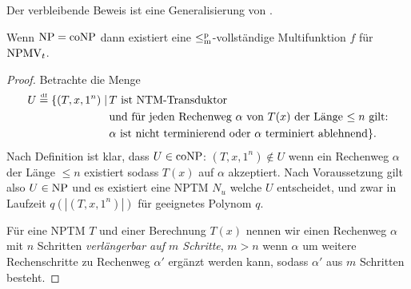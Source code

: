 Der verbleibende Beweis ist eine Generalisierung von \textcite{dingel_separation_2022}.
\begin{theorem}\label{thm:npmvt-vs-npconp}
    Wenn $\mathrm{NP}=\mathrm{coNP}$ dann existiert eine $\leq_\mathrm{m}^\mathrm{p}$-vollständige Multifunktion $f$ für $\mathrm{NPMV}_t$.
\end{theorem}
\begin{proof}
    Betrachte die Menge
\[ \begin{split} U \stackrel{\text{\smash{\normalfont\tiny df}}}{=}  \{ (T, x, 1^n) \mid \,&\text{$T$ ist NTM-Transduktor} \\ &\text{und für jeden Rechenweg $\alpha$ von $T(x)$ der Länge $\leq n$ gilt:} \\& \text{$\alpha$ ist nicht terminierend oder $\alpha$ terminiert ablehnend} \}. \end{split}  \]
    Nach Definition ist klar, dass $U\in\mathrm{coNP}$: $(T, x, 1^n)\not\in U$ wenn ein Rechenweg $\alpha$ der Länge $\leq n$ existiert sodass $T(x)$ auf $\alpha$ akzeptiert. Nach Voraussetzung gilt also $U\in\mathrm{NP}$ und es existiert eine NPTM $N_u$ welche $U$ entscheidet, und zwar in Laufzeit $q(|(T, x, 1^n)|)$ für geeignetes Polynom $q$.

    Für eine NPTM $T$ und einer Berechnung $T(x)$ nennen wir einen Rechenweg $\alpha$ mit $n$ Schritten \emph{verlängerbar auf $m$ Schritte}, $m>n$ wenn $\alpha$ um weitere Rechenschritte zu Rechenweg $\alpha'$ ergänzt werden kann, sodass $\alpha'$ aus $m$ Schritten besteht.


\end{proof}
